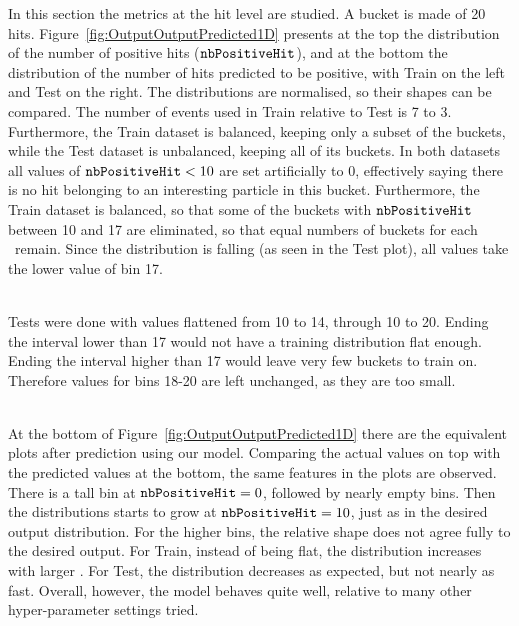 In this section the metrics at the hit level are studied. A bucket is made of 20 hits. Figure~\ref{fig:OutputOutputPredicted1D} presents at the top the distribution of the number of positive hits ($\nbPositiveHit$), and at the bottom the distribution of the number of hits predicted to be positive, with Train on the left and Test on the right. The distributions are normalised, so their shapes can be compared. The number of events used in Train relative to Test is 7 to 3. Furthermore, the Train dataset is balanced, keeping only a subset of the buckets, while the Test dataset is unbalanced, keeping all of its buckets. In both datasets all values of $\nbPositiveHit < 10$ are set artificially to 0, effectively saying there is no hit belonging to an interesting particle in this bucket. Furthermore, the Train dataset is balanced, so that some of the buckets with $\nbPositiveHit$ between 10 and 17 are eliminated, so that equal numbers of buckets for each \nbPositiveHit~remain. Since the distribution is falling (as seen in the Test plot), all values take the lower value of bin 17.

\ \\Tests were done with values flattened from 10 to 14, through 10 to 20. Ending the interval lower than 17 would not have a training distribution flat enough. Ending the interval higher than 17 would leave very few buckets to train on. Therefore values for bins 18-20 are left unchanged, as they are too small.

\ \\At the bottom of Figure~\ref{fig:OutputOutputPredicted1D} there are the equivalent plots after prediction using our model. Comparing the actual values on top with the predicted values at the bottom, the same features in the plots are observed. There is a tall bin at $\nbPositiveHit = 0$, followed by nearly empty bins. Then the distributions starts to grow at $\nbPositiveHit = 10$, just as in the desired output distribution. For the higher bins, the relative shape does not agree fully to the desired output. For Train, instead of being flat, the distribution increases with larger \nbPositiveHit. For Test, the distribution decreases as expected, but not nearly as fast. Overall, however, the model behaves quite well, relative to many other hyper-parameter settings tried.

